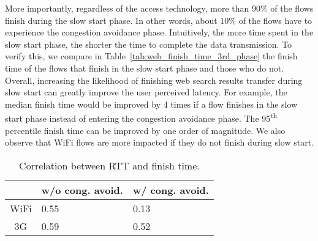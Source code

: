 More importantly, regardless of the access technology, more than 90\% of the flows finish during the slow start phase. In other words, about 10\% of the flows have to experience the congestion avoidance phase. Intuitively, the more time spent in the slow start phase, the shorter the time to complete the data transmission. To verify this, we compare in Table~\ref{tab:web_finish_time_3rd_phase} the finish time of the flows that finish in the slow start phase and those who do not. Overall, increasing the likelihood of finishing web search results transfer during slow start can greatly improve the user perceived latency. For example, the median finish time would be improved by 4 times if a flow finishes in the slow start phase instead of entering the congestion avoidance phase. The 95\textsuperscript{th} percentile finish time can be improved by one order of magnitude. We also observe that WiFi flows are more impacted if they do not finish during slow start.


\begin{table}[th]
\caption{Correlation between RTT and finish time.}
\label{tab:web_rtt_finish_time_correlation}
\centering
\renewcommand{\arraystretch}{1.0}
\begin{tabular}{c|C{2.5cm}|C{2.5cm}}
   \hline
   & w/o cong. avoid. & w/ cong. avoid. \\
   \hline
   WiFi & 0.55 & 0.13 \\
   3G & 0.59 & 0.52 \\
   \hline
\end{tabular}
\end{table}

